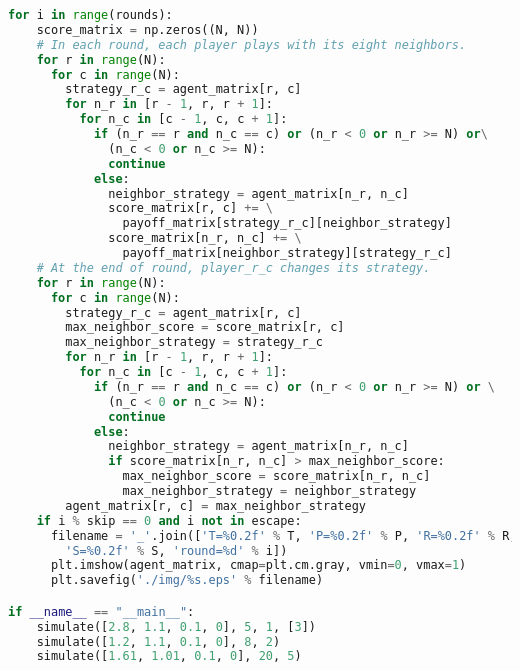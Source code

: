 \begin{lstlisting}[language=Python]
  for i in range(rounds):
    score_matrix = np.zeros((N, N))
    # In each round, each player plays with its eight neighbors.
    for r in range(N):
      for c in range(N):
        strategy_r_c = agent_matrix[r, c]
        for n_r in [r - 1, r, r + 1]:
          for n_c in [c - 1, c, c + 1]:
            if (n_r == r and n_c == c) or (n_r < 0 or n_r >= N) or\
              (n_c < 0 or n_c >= N):
              continue
            else:
              neighbor_strategy = agent_matrix[n_r, n_c]
              score_matrix[r, c] += \
                payoff_matrix[strategy_r_c][neighbor_strategy]
              score_matrix[n_r, n_c] += \
                payoff_matrix[neighbor_strategy][strategy_r_c]
    # At the end of round, player_r_c changes its strategy.
    for r in range(N):
      for c in range(N):
        strategy_r_c = agent_matrix[r, c]
        max_neighbor_score = score_matrix[r, c]
        max_neighbor_strategy = strategy_r_c
        for n_r in [r - 1, r, r + 1]:
          for n_c in [c - 1, c, c + 1]:
            if (n_r == r and n_c == c) or (n_r < 0 or n_r >= N) or \
              (n_c < 0 or n_c >= N):
              continue
            else:
              neighbor_strategy = agent_matrix[n_r, n_c]
              if score_matrix[n_r, n_c] > max_neighbor_score:
                max_neighbor_score = score_matrix[n_r, n_c]
                max_neighbor_strategy = neighbor_strategy
        agent_matrix[r, c] = max_neighbor_strategy
    if i % skip == 0 and i not in escape:
      filename = '_'.join(['T=%0.2f' % T, 'P=%0.2f' % P, 'R=%0.2f' % R,\
        'S=%0.2f' % S, 'round=%d' % i])
      plt.imshow(agent_matrix, cmap=plt.cm.gray, vmin=0, vmax=1)
      plt.savefig('./img/%s.eps' % filename)

if __name__ == "__main__":
    simulate([2.8, 1.1, 0.1, 0], 5, 1, [3])
    simulate([1.2, 1.1, 0.1, 0], 8, 2)
    simulate([1.61, 1.01, 0.1, 0], 20, 5)\end{lstlisting}\pagebreak
